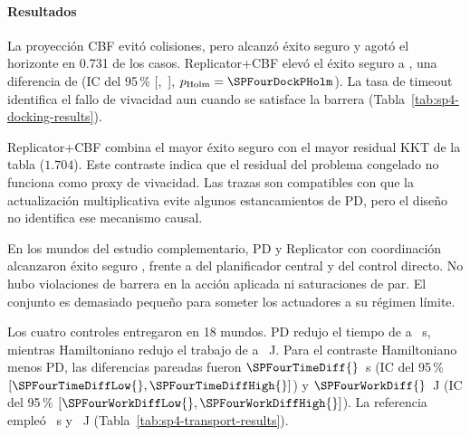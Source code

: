 \paragraph{Resultados}

La proyección CBF evitó colisiones, pero alcanzó éxito seguro \SPFourCBFSafe{} y agotó el horizonte en 0.731 de los casos. Replicator+CBF elevó el éxito seguro a \SPFourRepSafe{}, una diferencia de \SPFourDockEffect{} (IC del 95\,\% [\SPFourDockCILow{},~\SPFourDockCIHigh{}], $p_{\mathrm{Holm}}=\SPFourDockPHolm$). La tasa de timeout identifica el fallo de vivacidad aun cuando se satisface la barrera (Tabla~\ref{tab:sp4-docking-results}).

\begin{table}[!htbp]
  \centering
  \caption{Resultados pareados del experimento principal de acoplamiento dinámico.}
  \label{tab:sp4-docking-results}
  \resizebox{\textwidth}{!}{}
  \viuownsource
\end{table}
Replicator+CBF combina el mayor éxito seguro con el mayor residual KKT de la tabla ($1.704$). Este contraste indica que el residual del problema congelado no funciona como proxy de vivacidad. Las trazas son compatibles con que la actualización multiplicativa evite algunos estancamientos de PD, pero el diseño no identifica ese mecanismo causal.


En los \SPFourVFourWorlds{} mundos del estudio complementario, PD y Replicator con coordinación alcanzaron éxito seguro \SPFourVFourGameSafe{}, frente a \SPFourVFourCentralSafe{} del planificador central y \SPFourVFourDirectSafe{} del control directo. No hubo violaciones de barrera en la acción aplicada ni saturaciones de par. El conjunto es demasiado pequeño para someter los actuadores a su régimen límite.

Los cuatro controles entregaron en 18 mundos. PD redujo el tiempo de \SPFourHamiltonianTime{} a \SPFourPoseTime{}~s, mientras Hamiltoniano redujo el trabajo de \SPFourPoseWork{} a \SPFourHamiltonianWork{}~J. Para el contraste Hamiltoniano menos PD, las diferencias pareadas fueron $\SPFourTimeDiff{}$~s (IC del 95\,\% $[\SPFourTimeDiffLow{},\SPFourTimeDiffHigh{}]$) y $\SPFourWorkDiff{}$~J (IC del 95\,\% $[\SPFourWorkDiffLow{},\SPFourWorkDiffHigh{}]$). La referencia empleó \SPFourCentralTime{}~s y \SPFourCentralWork{}~J (Tabla~\ref{tab:sp4-transport-results}).

\begin{table}[!htbp]
  \centering
  \caption{Transporte planar en el estrato abierto nominal de E4-C.}
  \label{tab:sp4-transport-results}
  \resizebox{\textwidth}{!}{}
  \viuownsource
\end{table}


